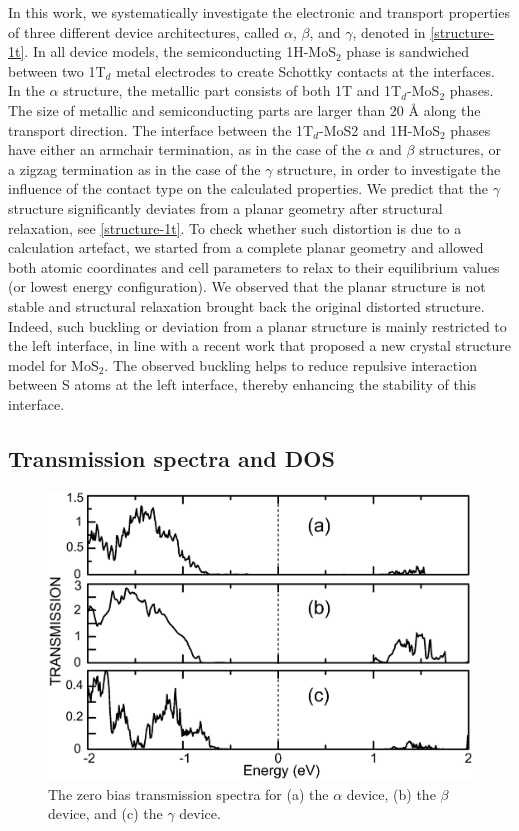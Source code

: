 In this work, we systematically investigate the electronic and transport properties of three different device architectures, called $\alpha$, $\beta$, and $\gamma$, denoted in \autoref{structure-1t}.  In all device models, the semiconducting 1H-MoS$_2$ phase is sandwiched between two 1T$_d$ metal electrodes to create Schottky contacts at the interfaces. In the $\alpha$ structure, the metallic part consists of both 1T and 1T$_d$-MoS$_2$ phases. The size of metallic and semiconducting parts are larger than 20 {\AA} along the transport direction. The interface between the 1T$_d$-MoS2 and 1H-MoS$_2$ phases have either an armchair termination, as in the case of the $\alpha$ and $\beta$ structures, or a zigzag termination as in the case of the $\gamma$ structure, in order to investigate the influence of the contact type on the calculated properties. We predict that the $\gamma$ structure significantly deviates from a planar geometry after structural relaxation, see \autoref{structure-1t}. To check whether such distortion is due to a calculation artefact, we started from a complete planar geometry and allowed both atomic coordinates and cell parameters to relax to their equilibrium values (or lowest energy configuration). We observed that the planar structure is not stable and structural relaxation brought back the original distorted structure. Indeed, such buckling or deviation from a planar structure is mainly restricted to the left interface, in line with a recent work that proposed a new crystal structure model for MoS$_2$\cite{C5NR07715J}.  The observed buckling helps to reduce repulsive interaction between S atoms at the left interface, thereby enhancing the stability of this interface.  



\subsection{Transmission spectra and DOS}

\begin{figure}[htb]
\centering
\includegraphics[width=0.8\linewidth]{TRANSMISSION-ALL-STRUCTURES.eps}%
\caption{\label{transport} The zero bias transmission spectra for (a) the $\alpha$ device, (b) the $\beta$ device, and (c) the $\gamma$ device. }
\end{figure}

